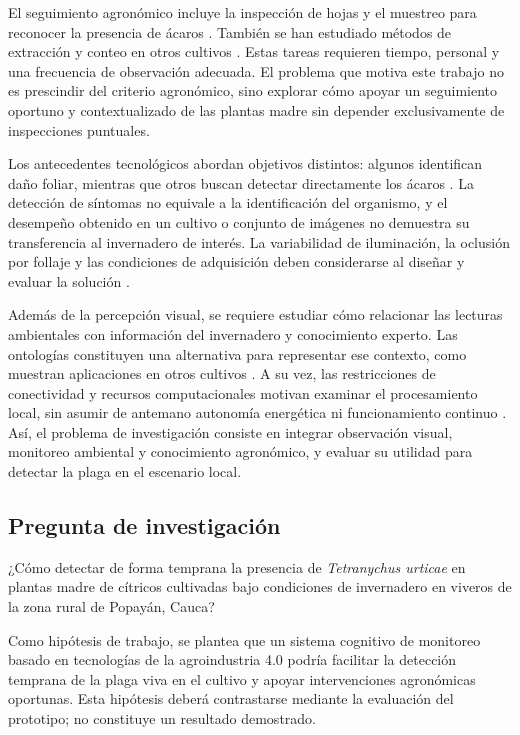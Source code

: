 El seguimiento agronómico incluye la inspección de hojas y el muestreo para
reconocer la presencia de ácaros \cite{ucipm2023}. También se han estudiado
métodos de extracción y conteo en otros cultivos
\cite{extractionTechniques2017,macmillan2015}. Estas tareas requieren tiempo,
personal y una frecuencia de observación adecuada. El problema que motiva este
trabajo no es prescindir del criterio agronómico, sino explorar cómo apoyar un
seguimiento oportuno y contextualizado de las plantas madre sin depender
exclusivamente de inspecciones puntuales.

Los antecedentes tecnológicos abordan objetivos distintos: algunos identifican
daño foliar, mientras que otros buscan detectar directamente los ácaros
\cite{nieuwenhuizen2020,zhou2023}. La detección de síntomas no equivale a la
identificación del organismo, y el desempeño obtenido en un cultivo o conjunto
de imágenes no demuestra su transferencia al invernadero de interés. La
variabilidad de iluminación, la oclusión por follaje y las condiciones de
adquisición deben considerarse al diseñar y evaluar la solución
\cite{jelali2024}.

Además de la percepción visual, se requiere estudiar cómo relacionar las
lecturas ambientales con información del invernadero y conocimiento experto.
Las ontologías constituyen una alternativa para representar ese contexto,
como muestran aplicaciones en otros cultivos \cite{umar2024ontology}. A su
vez, las restricciones de conectividad y recursos computacionales motivan
examinar el procesamiento local, sin asumir de antemano autonomía energética
ni funcionamiento continuo \cite{yu2025}. Así, el problema de investigación
consiste en integrar observación visual, monitoreo ambiental y conocimiento
agronómico, y evaluar su utilidad para detectar la plaga en el escenario local.

\subsection{Pregunta de investigación}
\label{subsec:pregunta-investigacion}

¿Cómo detectar de forma temprana la presencia de \textit{Tetranychus urticae}
en plantas madre de cítricos cultivadas bajo condiciones de invernadero en
viveros de la zona rural de Popayán, Cauca?

Como hipótesis de trabajo, se plantea que un sistema cognitivo de monitoreo
basado en tecnologías de la agroindustria 4.0 podría facilitar la detección
temprana de la plaga viva en el cultivo y apoyar intervenciones agronómicas
oportunas. Esta hipótesis deberá contrastarse mediante la evaluación del
prototipo; no constituye un resultado demostrado.

